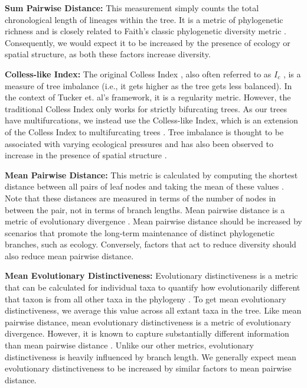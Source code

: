\textbf{Sum Pairwise Distance:} This measurement simply counts the total chronological length of lineages within the tree.
It is a metric of phylogenetic richness and is closely related to Faith's classic phylogenetic diversity metric \citep{faithConservationEvaluationPhylogenetic1992}.
Consequently, we would expect it to be increased by the presence of ecology or spatial structure, as both these factors increase diversity.

\textbf{Colless-like Index:}
The original Colless Index \citep{collessReviewPhylogeneticsTheory1982}, also often referred to as $I_c$ \citep{shaoTreeBalance1990}, is a measure of tree imbalance (i.e., it gets higher as the tree gets less balanced).
In the context of Tucker et. al's framework, it is a regularity metric.
However, the traditional Colless Index only works for strictly bifurcating trees.
As our trees have multifurcations, we instead use the Colless-like Index, which is an extension of the Colless Index to multifurcating trees \citep{mirSoundCollesslikeBalance2018}.
Tree imbalance is thought to be associated with varying ecological pressures \citep{chamberlainPhylogeneticTreeShape2014, burressEcologicalOpportunityAlters} and has also been observed to increase in the presence of spatial structure \citep{scottInferringTumorProliferative2020}.

\textbf{Mean Pairwise Distance:}
This metric is calculated by computing the shortest distance between all pairs of leaf nodes and taking the mean of these values \citep{webbExploringPhylogeneticStructure2000}.
Note that these distances are measured in terms of the number of nodes in between the pair, not in terms of branch lengths.
Mean pairwise distance is a metric of evolutionary divergence \citep{tuckerGuidePhylogeneticMetrics2017}.
Mean pairwise distance should be increased by scenarios that promote the long-term maintenance of distinct phylogenetic branches, such as ecology.
Conversely, factors that act to reduce diversity should also reduce mean pairwise distance.

\textbf{Mean Evolutionary Distinctiveness:}
Evolutionary distinctiveness is a metric that can be calculated for individual taxa to quantify how evolutionarily different that taxon is from all other taxa in the phylogeny \citep{isaacMammalsEDGEConservation2007}.
To get mean evolutionary distinctiveness, we average this value across all extant taxa in the tree.
Like mean pairwise distance, mean evolutionary distinctiveness is a metric of evolutionary divergence.
However, it is known to capture substantially different information than mean pairwise distance \citep{tuckerGuidePhylogeneticMetrics2017}.
Unlike our other metrics, evolutionary distinctiveness is heavily influenced by branch length.
We generally expect mean evolutionary distinctiveness to be increased by similar factors to mean pairwise distance.

